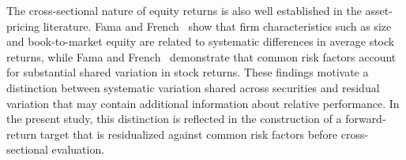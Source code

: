 \medskip

The cross-sectional nature of equity returns is also well established in the asset-pricing literature. Fama and French~\cite{FamaFrench1992} show that firm characteristics such as size and book-to-market equity are related to systematic differences in average stock returns, while Fama and French~\cite{FamaFrench1993} demonstrate that common risk factors account for substantial shared variation in stock returns. These findings motivate a distinction between systematic variation shared across securities and residual variation that may contain additional information about relative performance. In the present study, this distinction is reflected in the construction of a forward-return target that is residualized against common risk factors before cross-sectional evaluation.

\medskip





